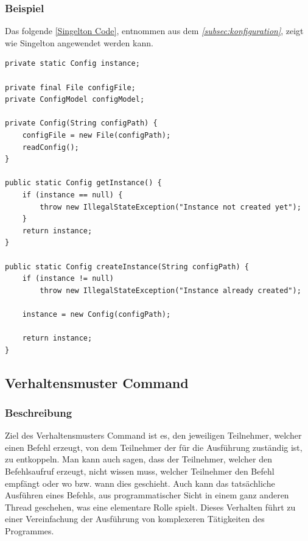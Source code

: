 \subsubsection{Beispiel}
Das folgende \autoref{Singelton Code}, entnommen aus dem \textit{\autoref{subsec:konfiguration}}, zeigt wie Singelton angewendet werden kann.
\begin{lstlisting}[style=java,caption=Singelton-Codebeispiel,label=Singelton Code]
private static Config instance;

private final File configFile;
private ConfigModel configModel;

private Config(String configPath) {
    configFile = new File(configPath);
    readConfig();
}

public static Config getInstance() {
    if (instance == null) {
        throw new IllegalStateException("Instance not created yet");
    }
    return instance;
}

public static Config createInstance(String configPath) {
    if (instance != null)
        throw new IllegalStateException("Instance already created");

    instance = new Config(configPath);

    return instance;
}
\end{lstlisting}
\subsection{Verhaltensmuster Command}\label{subsec:verhaltensmuster-command}
\subsubsection{Beschreibung}
Ziel des Verhaltensmusters Command ist es, den jeweiligen Teilnehmer, welcher einen Befehl erzeugt, von dem Teilnehmer der für die Ausführung zuständig ist, zu entkoppeln.
Man kann auch sagen, dass der Teilnehmer, welcher den Befehlsaufruf erzeugt, nicht wissen muss, welcher Teilnehmer den Befehl empfängt oder wo bzw. wann dies geschieht.
Auch kann das tatsächliche Ausführen eines Befehls, aus programmatischer Sicht in einem ganz anderen Thread geschehen, was eine elementare Rolle spielt.
Dieses Verhalten führt zu einer Vereinfachung der Ausführung von komplexeren Tätigkeiten des Programmes.
